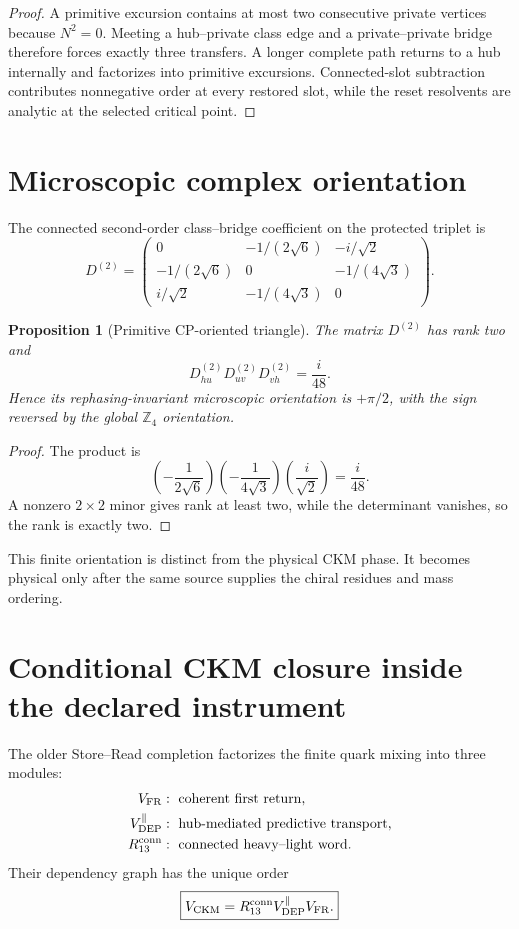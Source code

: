 \documentclass[11pt,oneside,openany]{book}
\numberwithin{equation}{chapter}
\newtheorem{proposition}[theorem]{Proposition}
\theoremstyle{definition}
\theoremstyle{remark}
\newcommand{\Zfour}{\mathbb Z_4}
\newcommand{\CKM}{\mathrm{CKM}}
\begin{document}
\begin{proof}
A primitive excursion contains at most two consecutive private vertices
because \(N^2=0\).  Meeting a hub--private class edge and a private--private
bridge therefore forces exactly three transfers.  A longer complete path
returns to a hub internally and factorizes into primitive excursions.
Connected-slot subtraction contributes nonnegative order at every restored
slot, while the reset resolvents are analytic at the selected critical
point.
\end{proof}

\section{Microscopic complex orientation}

The connected second-order class--bridge coefficient on the protected
triplet is
\[
 D^{(2)}
 =
 \begin{pmatrix}
 0&-1/(2\sqrt6)&-i/\sqrt2\\
 -1/(2\sqrt6)&0&-1/(4\sqrt3)\\
 i/\sqrt2&-1/(4\sqrt3)&0
 \end{pmatrix}.
\]

\begin{proposition}[Primitive CP-oriented triangle]
\label{prop:primitive-cp-triangle}
The matrix \(D^{(2)}\) has rank two and
\[
 \boxed{
 D^{(2)}_{hu}D^{(2)}_{uv}D^{(2)}_{vh}=\frac{i}{48}.}
\]
Hence its rephasing-invariant microscopic orientation is \(+\pi/2\), with
the sign reversed by the global \(\Zfour\) orientation.
\end{proposition}

\begin{proof}
The product is
\[
 \left(-\frac1{2\sqrt6}\right)
 \left(-\frac1{4\sqrt3}\right)
 \left(\frac{i}{\sqrt2}\right)
 =\frac{i}{48}.
\]
A nonzero \(2\times2\) minor gives rank at least two, while the determinant
vanishes, so the rank is exactly two.
\end{proof}

This finite orientation is distinct from the physical CKM phase.  It becomes
physical only after the same source supplies the chiral residues and mass
ordering.

\section{Conditional CKM closure inside the declared instrument}

The older Store--Read completion factorizes the finite quark mixing into
three modules:
\[
 \begin{aligned}
 V_{\rm FR}&:\ \text{coherent first return},\\
 V_{\rm DEP}^{\parallel}&:\ \text{hub-mediated predictive transport},\\
 R_{13}^{\rm conn}&:\ \text{connected heavy--light word}.
 \end{aligned}
\]
Their dependency graph has the unique order
\[
 \boxed{
 V_{\CKM}
 =R_{13}^{\rm conn}
  V_{\rm DEP}^{\parallel}
  V_{\rm FR}.}
\]
\end{document}
